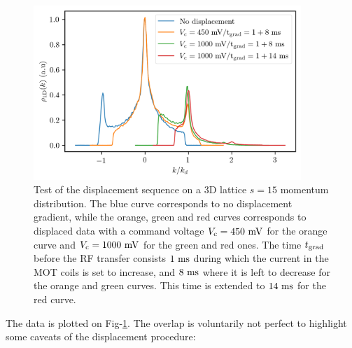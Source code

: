 \begin{figure}
    \centering
    \includegraphics[width=0.9\textwidth]{Fig/Chapter5/overlap.png}
    \caption[Test of the displacement sequence on a 3D lattice $s=15$ momentum distribution]{Test of the displacement sequence on a 3D lattice $s=15$ momentum distribution. The blue curve corresponds to no displacement gradient, while the orange, green and red curves corresponds to displaced data with a command voltage $V_{\rm{c}}=450 \ \rm{mV}$ for the orange curve and $V_{\rm{c}}=1000 \ \rm{mV}$ for the green and red ones. The time $t_{\rm{grad}}$ before the RF transfer consists $1 \ \rm{ms}$ during which the current in the MOT coils is set to increase, and $8 \ \rm{ms}$ where it is left to decrease for the orange and green curves. This time is extended to $14 \ \rm{ms}$ for the red curve.}
    \label{fig:1D_overlap_mott}
\end{figure}

The data is plotted on Fig-\ref{fig:1D_overlap_mott}. The overlap is voluntarily not perfect to highlight some caveats of the displacement procedure:

